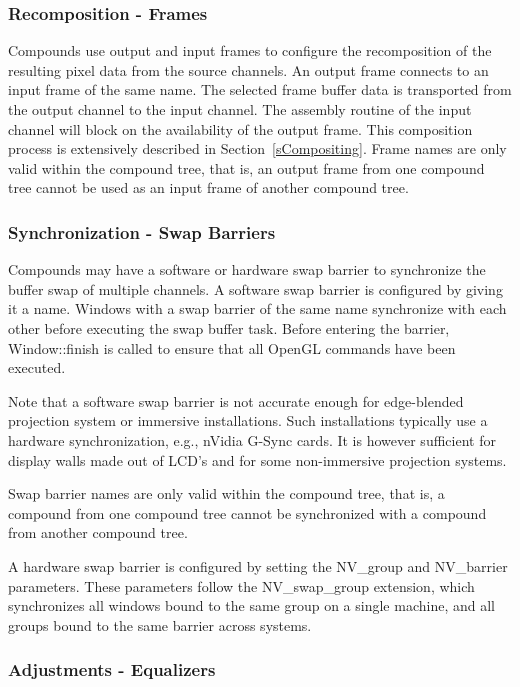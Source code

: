 \documentclass[10pt,a4]{scrartcl}
\newcommand{\sref}[1]{Section~\ref{#1}}
\begin{document}
\subsubsection{Recomposition - Frames}
Compounds use output and input frames to configure the recomposition of
the resulting pixel data from the source channels. An output frame
connects to an input frame of the same name. The selected frame buffer
data is transported from the output channel to the input channel. The
assembly routine of the input channel will block on the availability of
the output frame. This composition process is extensively described in
\sref{sCompositing}. Frame names are only valid within the compound
tree, that is, an output frame from one compound tree cannot be used as
an input frame of another compound tree.

\subsubsection{\label{sSwapBarrier}Synchronization - Swap Barriers}
Compounds may have a software or hardware swap barrier to synchronize the
buffer swap of multiple channels. A software swap barrier is configured
by giving it a name. Windows with a swap barrier of the same name
synchronize with each other before executing the swap buffer
task. Before entering the barrier, \textsf{Window::finish} is called to
ensure that all OpenGL commands have been executed.

Note that a software swap barrier is not accurate enough for
edge-blended projection system or immersive installations. Such
installations typically use a hardware synchronization, e.g., nVidia
G-Sync cards. It is however sufficient for display walls made out of
LCD's and for some non-immersive projection systems.

Swap barrier names are only valid within the compound tree, that is, a
compound from one compound tree cannot be synchronized with a compound
from another compound tree.

A hardware swap barrier is configured by setting the \textsf{NV\_group} and
\textsf{NV\_barrier} parameters. These parameters follow the
\textsf{NV\_swap\_group} extension, which synchronizes all windows bound to the
same group on a single machine, and all groups bound to the same barrier across
systems.

\subsubsection{\label{sEqualizers}Adjustments - Equalizers}
\end{document}
